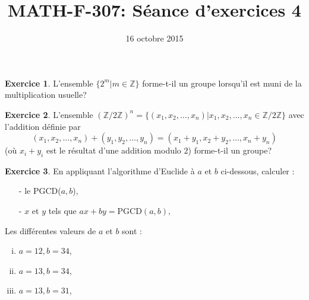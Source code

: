 \documentclass[11pt, a4paper]{article}
\begin{document}
 

\thispagestyle{empty}

\title{MATH-F-307: S\'eance d'exercices 4} 
\author{} 
\date{16 octobre 2015}

\theoremstyle{plain} 
\newtheorem*{theo}{Th\'eor\`eme}

\theoremstyle{definition} 
\newtheorem{exo}{Exercice}

\newcommand{\R}{\mathbb{R}} 
\newcommand{\Z}{\mathbb{Z}} 
\newcommand{\N}{\mathbb{N}} 

\renewcommand{\FrenchLabelItem}{\textbullet}

\maketitle


\begin{exo}
L'ensemble $\{2^m | m \in \Z\}$ forme-t-il un groupe lorsqu'il est muni de la multiplication usuelle?
\end{exo}

\vspace*{0.8cm}
\begin{exo}
L'ensemble $(\Z/2\Z)^n=\{(x_1,x_2,\ldots,x_n)|x_1,x_2,\ldots,x_n\in \Z/2\Z\}$ avec l'addition d\'efinie par $$(x_1,x_2,\ldots,x_n)+(y_1,y_2,\ldots,y_n)=(x_1+y_1,x_2+y_2,\ldots,x_n+y_n)$$
(o\`u $x_i+y_i$ est le r\'esultat d'une addition modulo $2$) forme-t-il un groupe?
\end{exo}

\vspace*{0.8cm}
\begin{exo}
En appliquant l'algorithme d'Euclide \`a $a$ et $b$ ci-dessous, calculer :
\begin{itemize}
\item[-] le PGCD($a,b$),
\item[-] $x$ et $y$ tels que $ ax + by = \text{PGCD}(a,b),$
\end{itemize}
Les diff\'erentes valeurs de $a$ et $b$ sont :
\begin{enumerate}[(i)]
\item $a = 12, b = 34$,
\item $a = 13, b = 34$,
\item $a = 13, b = 31$,
\end{enumerate}
\end{exo}
\end{document}
